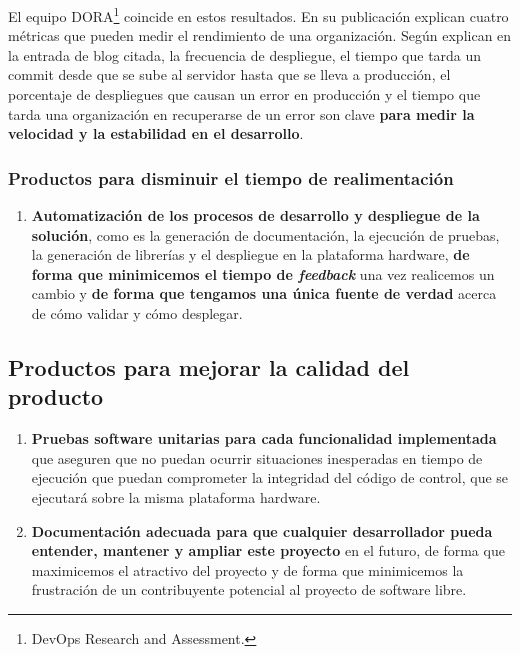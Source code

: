 El equipo DORA\footnote{DevOps Research and Assessment.} coincide en estos resultados.
En su publicación \cite{EliteDevOps} explican cuatro métricas que pueden medir el
rendimiento de una organización. Según explican en la entrada de blog citada,
la frecuencia de despliegue, el tiempo que tarda un commit desde que se sube
al servidor hasta que se lleva a producción,
el porcentaje de despliegues que causan un error en producción y el tiempo
que tarda una organización en recuperarse de un error son clave \textbf{para medir la
velocidad y la estabilidad en el desarrollo}.

\subsubsection{Productos para disminuir el tiempo de realimentación}

\begin{enumerate}
    \item \textbf{Automatización de los procesos de desarrollo y despliegue de la solución}, como es
    la generación de documentación, la ejecución de pruebas, la generación de librerías
    y el despliegue en la plataforma hardware, \textbf{de forma que minimicemos el tiempo de \textit{feedback}}
    una vez realicemos un cambio y \textbf{de forma que tengamos una única fuente de verdad} acerca de cómo
    validar y cómo desplegar.
\end{enumerate}

\subsection{Productos para mejorar la calidad del producto}

\begin{enumerate}
    \item \textbf{Pruebas software unitarias para cada funcionalidad implementada} que aseguren que no
    puedan ocurrir situaciones inesperadas en tiempo
    de ejecución que puedan comprometer la integridad del código de control, que se ejecutará sobre
    la misma plataforma hardware.
    \item \textbf{Documentación adecuada para que cualquier desarrollador pueda entender,
    mantener y ampliar este proyecto} en el futuro, de forma que maximicemos el atractivo
    del proyecto y de forma que minimicemos la frustración de un contribuyente potencial
    al proyecto de software libre.
\end{enumerate}

